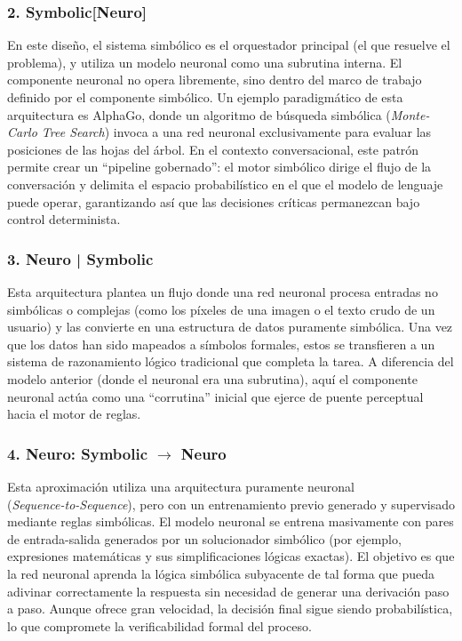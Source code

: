 \documentclass[12pt,a4paper]{report}
\begin{document}
\subsubsection{2. Symbolic[Neuro]}
En este diseño, el sistema simbólico es el orquestador principal (el que resuelve el problema), y utiliza un modelo neuronal como una subrutina interna. El componente neuronal no opera libremente, sino dentro del marco de trabajo definido por el componente simbólico. Un ejemplo paradigmático de esta arquitectura es AlphaGo, donde un algoritmo de búsqueda simbólica (\textit{Monte-Carlo Tree Search}) invoca a una red neuronal exclusivamente para evaluar las posiciones de las hojas del árbol. En el contexto conversacional, este patrón permite crear un ``pipeline gobernado'': el motor simbólico dirige el flujo de la conversación y delimita el espacio probabilístico en el que el modelo de lenguaje puede operar, garantizando así que las decisiones críticas permanezcan bajo control determinista.

\subsubsection{3. Neuro | Symbolic}
Esta arquitectura plantea un flujo donde una red neuronal procesa entradas no simbólicas o complejas (como los píxeles de una imagen o el texto crudo de un usuario) y las convierte en una estructura de datos puramente simbólica. Una vez que los datos han sido mapeados a símbolos formales, estos se transfieren a un sistema de razonamiento lógico tradicional que completa la tarea. A diferencia del modelo anterior (donde el neuronal era una subrutina), aquí el componente neuronal actúa como una ``corrutina'' inicial que ejerce de puente perceptual hacia el motor de reglas.

\subsubsection{4. Neuro: Symbolic $\rightarrow$ Neuro}
Esta aproximación utiliza una arquitectura puramente neuronal \\ (\textit{Sequence-to-Sequence}), pero con un entrenamiento previo generado y supervisado mediante reglas simbólicas. El modelo neuronal se entrena masivamente con pares de entrada-salida generados por un solucionador simbólico (por ejemplo, expresiones matemáticas y sus simplificaciones lógicas exactas). El objetivo es que la red neuronal aprenda la lógica simbólica subyacente de tal forma que pueda adivinar correctamente la respuesta sin necesidad de generar una derivación paso a paso. Aunque ofrece gran velocidad, la decisión final sigue siendo probabilística, lo que compromete la verificabilidad formal del proceso.
\end{document}
